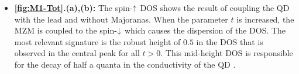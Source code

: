 \begin{itemize}
    \item\textbf{ \ref{fig:M1-Tot}.(a),(b):}  The spin-$\uparrow$ DOS shows the result of coupling the QD with the lead and without Majoranas. When the parameter $t$ is increased, the MZM is coupled to the spin-$\downarrow$ which causes the dispersion of the DOS. The most relevant signature is the robust height of $0.5$  in the DOS that is observed in the central peak for all $t>0$. This mid-height DOS is responsible for the decay of half a quanta in the conductivity of the QD \cite{liu_detecting_2011}.

    \begin{figure}[h]
     \centering
       \\
    

\end{figure}
\end{itemize}
